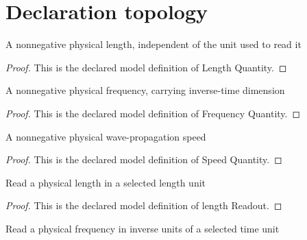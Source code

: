 \section{Declaration topology}
\begin{definition}
  \label{def:physics:phyx-mini-0177:phyxminiproblems-problemphyxmini0177-lengthquantity}
  A nonnegative physical length, independent of the unit used to read it
\end{definition}
\begin{proof}
  This is the declared model definition of Length Quantity.
\end{proof}
\begin{definition}
  \label{def:physics:phyx-mini-0177:phyxminiproblems-problemphyxmini0177-frequencyquantity}
  A nonnegative physical frequency, carrying inverse-time dimension
\end{definition}
\begin{proof}
  This is the declared model definition of Frequency Quantity.
\end{proof}
\begin{definition}
  \label{def:physics:phyx-mini-0177:phyxminiproblems-problemphyxmini0177-speedquantity}
  A nonnegative physical wave-propagation speed
\end{definition}
\begin{proof}
  This is the declared model definition of Speed Quantity.
\end{proof}
\begin{definition}
  \label{def:physics:phyx-mini-0177:phyxminiproblems-problemphyxmini0177-lengthreadout}
  Read a physical length in a selected length unit
\end{definition}
\begin{proof}
  This is the declared model definition of length Readout.
\end{proof}
\begin{definition}
  \label{def:physics:phyx-mini-0177:phyxminiproblems-problemphyxmini0177-frequencyreadout}
  Read a physical frequency in inverse units of a selected time unit
\end{definition}
